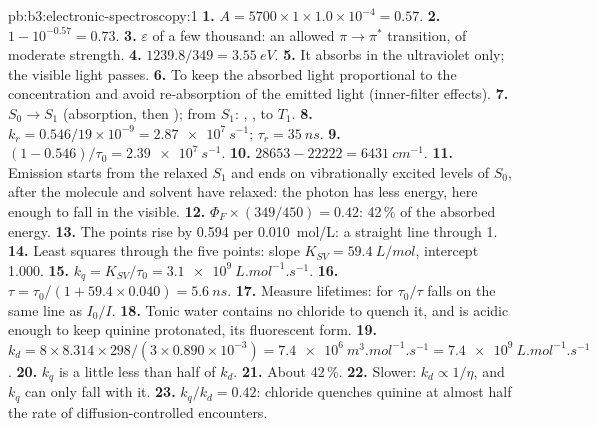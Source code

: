 \begin{solution}{pb:b3:electronic-spectroscopy:1}
\textbf{1.} $A = 5700 \times 1 \times 1.0\times10^{-4} = 0.57$.
\textbf{2.} $1 - 10^{-0.57} = 0.73$.
\textbf{3.} $\varepsilon$ of a few thousand: an allowed $\pi\to\pi^*$ transition, of moderate
strength.
\textbf{4.} $1239.8/349 = \qty{3.55}{eV}$.
\textbf{5.} It absorbs in the ultraviolet only; the visible light passes.
\textbf{6.} To keep the absorbed light proportional to the concentration and avoid
re-absorption of the emitted light (inner-filter effects).
\textbf{7.} $S_0 \to S_1$ (absorption, then ); from $S_1$:
, ,  to $T_1$.
\textbf{8.} $k_r = 0.546/19 \times 10^{-9} = \qty{2.87e7}{s^{-1}}$; $\tau_r = \qty{35}{ns}$.
\textbf{9.} $(1 - 0.546)/\tau_0 = \qty{2.39e7}{s^{-1}}$.
\textbf{10.} $28653 - 22222 = \qty{6431}{cm^{-1}}$.
\textbf{11.} Emission starts from the relaxed $S_1$ and ends on vibrationally excited
levels of $S_0$, after the molecule and solvent have relaxed: the photon has less
energy, here enough to fall in the visible.
\textbf{12.} $\Phi_F \times (349/450) = 0.42$: 42\,\% of the absorbed energy.
\textbf{13.} The points rise by 0.594 per \qty{0.010}{mol/L}: a straight line through 1.
\textbf{14.} Least squares through the five points: slope $K_{SV} = \qty{59.4}{L/mol}$,
intercept 1.000.
\textbf{15.} $k_q = K_{SV}/\tau_0 = \qty{3.1e9}{L.mol^{-1}.s^{-1}}$.
\textbf{16.} $\tau = \tau_0/(1 + 59.4 \times 0.040) = \qty{5.6}{ns}$.
\textbf{17.} Measure lifetimes: for  $\tau_0/\tau$ falls on the same line
as $I_0/I$.
\textbf{18.} Tonic water contains no chloride to quench it, and is acidic enough to
keep quinine protonated, its fluorescent form.
\textbf{19.} $k_d = 8 \times 8.314 \times 298/(3 \times 0.890\times10^{-3}) =
\qty{7.4e6}{m^3.mol^{-1}.s^{-1}} = \qty{7.4e9}{L.mol^{-1}.s^{-1}}$.
\textbf{20.} $k_q$ is a little less than half of $k_d$.
\textbf{21.} About 42\,\%.
\textbf{22.} Slower: $k_d \propto 1/\eta$, and $k_q$ can only fall with it.
\textbf{23.} \textbf{$k_q/k_d = 0.42$}: chloride quenches quinine at almost half the
rate of diffusion-controlled encounters.
\end{solution}
